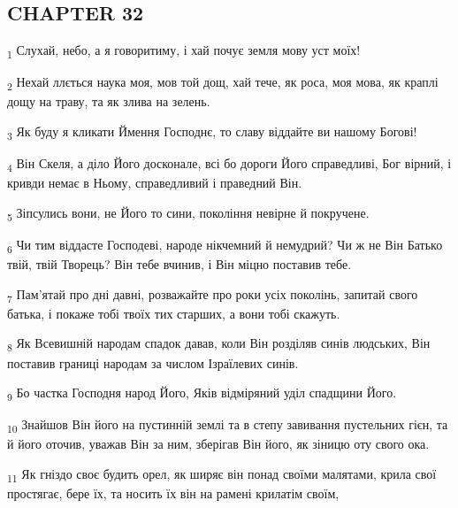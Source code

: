 \subsection{CHAPTER 32}
\begin{tcolorbox}
\textsubscript{1} Слухай, небо, а я говоритиму, і хай почує земля мову уст моїх!
\end{tcolorbox}
\begin{tcolorbox}
\textsubscript{2} Нехай ллється наука моя, мов той дощ, хай тече, як роса, моя мова, як краплі дощу на траву, та як злива на зелень.
\end{tcolorbox}
\begin{tcolorbox}
\textsubscript{3} Як буду я кликати Ймення Господнє, то славу віддайте ви нашому Богові!
\end{tcolorbox}
\begin{tcolorbox}
\textsubscript{4} Він Скеля, а діло Його досконале, всі бо дороги Його справедливі, Бог вірний, і кривди немає в Ньому, справедливий і праведний Він.
\end{tcolorbox}
\begin{tcolorbox}
\textsubscript{5} Зіпсулись вони, не Його то сини, покоління невірне й покручене.
\end{tcolorbox}
\begin{tcolorbox}
\textsubscript{6} Чи тим віддасте Господеві, народе нікчемний й немудрий? Чи ж не Він Батько твій, твій Творець? Він тебе вчинив, і Він міцно поставив тебе.
\end{tcolorbox}
\begin{tcolorbox}
\textsubscript{7} Пам'ятай про дні давні, розважайте про роки усіх поколінь, запитай свого батька, і покаже тобі твоїх тих старших, а вони тобі скажуть.
\end{tcolorbox}
\begin{tcolorbox}
\textsubscript{8} Як Всевишній народам спадок давав, коли Він розділяв синів людських, Він поставив границі народам за числом Ізраїлевих синів.
\end{tcolorbox}
\begin{tcolorbox}
\textsubscript{9} Бо частка Господня народ Його, Яків відміряний уділ спадщини Його.
\end{tcolorbox}
\begin{tcolorbox}
\textsubscript{10} Знайшов Він його на пустинній землі та в степу завивання пустельних гієн, та й його оточив, уважав Він за ним, зберігав Він його, як зіницю оту свого ока.
\end{tcolorbox}
\begin{tcolorbox}
\textsubscript{11} Як гніздо своє будить орел, як ширяє він понад своїми малятами, крила свої простягає, бере їх, та носить їх він на рамені крилатім своїм,
\end{tcolorbox}
